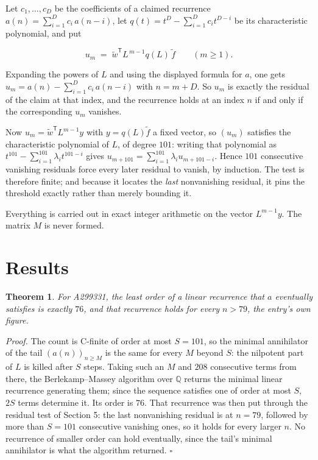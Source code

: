 \documentclass[11pt]{article}
\newtheorem{theorem}{Theorem}
\theoremstyle{definition}
\begin{document}
Let $c_1,\dots,c_D$ be the coefficients of a claimed recurrence $a(n) = \sum_{i=1}^{D} c_i\,a(n-i)$, let $q(t) = t^{D} - \sum_{i=1}^{D} c_i t^{D-i}$ be its characteristic polynomial, and put

\[u_m \;=\; \tilde w^{\mathsf T} L^{\,m-1} q(L)\,\tilde f \qquad (m \ge 1).\]

Expanding the powers of $L$ and using the displayed formula for $a$, one gets $u_m = a(n) - \sum_{i=1}^{D} c_i\,a(n-i)$ with $n = m + D$. So $u_m$ is exactly the residual of the claim at that index, and the recurrence holds at an index $n$ if and only if the corresponding $u_m$ vanishes.

Now $u_m = \tilde w^{\mathsf T} L^{m-1} y$ with $y = q(L)\tilde f$ a fixed vector, so $(u_m)$ satisfies the characteristic polynomial of $L$, of degree $101$: writing that polynomial as $t^{101} - \sum_{i=1}^{101} \lambda_i t^{101-i}$ gives $u_{m+101} = \sum_{i=1}^{101} \lambda_i u_{m+101-i}$. Hence $101$ consecutive vanishing residuals force every later residual to vanish, by induction. The test is therefore finite; and because it locates the {\itshape last} nonvanishing residual, it pins the threshold exactly rather than merely bounding it.

Everything is carried out in exact integer arithmetic on the vector $L^{m-1}y$. The matrix $M$ is never formed.

\section{Results}

\begin{theorem} For A299331, the least order of a linear recurrence that $a$ eventually satisfies is exactly $76$, and that recurrence holds for every $n > 79$, the entry's own figure.\end{theorem}

{\itshape Proof.} The count is C-finite of order at most $S = 101$, so the minimal annihilator of the tail $(a(n))_{n \ge M}$ is the same for every $M$ beyond $S$: the nilpotent part of $L$ is killed after $S$ steps. Taking such an $M$ and $208$ consecutive terms from there, the Berlekamp--Massey algorithm over $\mathbb{Q}$ returns the minimal linear recurrence generating them; since the sequence satisfies one of order at most $S$, $2S$ terms determine it. Its order is $76$. That recurrence was then put through the residual test of Section 5: the last nonvanishing residual is at $n = 79$, followed by more than $S = 101$ consecutive vanishing ones, so it holds for every larger $n$. No recurrence of smaller order can hold eventually, since the tail's minimal annihilator is what the algorithm returned. $\square$
\end{document}
